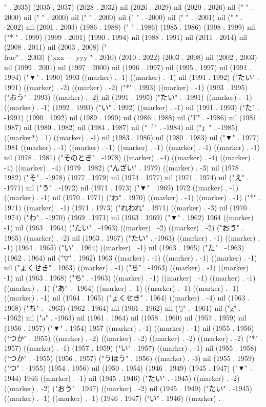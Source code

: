 {" . 2035) (2035 . 2037) (2028 . 2032) nil (2026 . 2029) nil (2020 . 2026) nil (" " . 2000) nil (" " . 2000) nil ("
" . 2000) nil ("
" . -2000) nil (" " . -2001) nil (" " . -2002) nil (2001 . 2003) (1986 . 1988) (" " . 1986) (1985 . 1986) (1998 . 1999) nil ("*
" . 1999) (1999 . 2001) (1990 . 1994) nil (1988 . 1991) nil (2011 . 2014) nil (2008 . 2011) nil (2003 . 2008) ("\\frac" . -2003) ("xxx
---
yyy
" . 2010) (2010 . 2022) (2003 . 2008) nil (2002 . 2003) nil (1999 . 2001) nil (1997 . 2000) nil (1996 . 1997) nil (1995 . 1997) nil (1991 . 1994) ("▼" . 1990) 1993 ((marker) . -1) ((marker) . -1) nil (1991 . 1992) ("たい" . 1991) ((marker) . -2) ((marker) . -2) ("*" . 1993) ((marker) . -1) (1993 . 1995) ("おう" . 1993) ((marker) . -2) nil (1991 . 1995) ("たい" . -1991) ((marker) . -1) ((marker) . -1) (1992 . 1993) ("い" . 1992) ((marker) . -1) nil (1991 . 1993) ("た" . -1991) (1990 . 1992) nil (1989 . 1990) nil (1986 . 1988) nil ("F" . -1986) nil (1981 . 1987) nil (1980 . 1982) nil (1984 . 1987) nil ("「" . -1984) nil ("」" . -1985) ((marker*) . 1) ((marker) . -1) nil (1983 . 1986) nil (1980 . 1983) nil ("▼" . 1977) 1981 ((marker) . -1) ((marker) . -1) ((marker) . -1) ((marker) . -1) ((marker) . -1) nil (1978 . 1981) ("そのとき" . -1978) ((marker) . -4) ((marker) . -4) ((marker) . -4) ((marker) . -4) (1979 . 1982) ("んざい" . 1979) ((marker) . -3) nil (1978 . 1982) ("そ" . -1978) (1977 . 1979) nil (1974 . 1977) nil (1971 . 1974) nil ("え" . -1971) nil ("う" . -1972) nil (1971 . 1973) ("▼" . 1969) 1972 ((marker) . -1) ((marker) . -1) nil (1970 . 1971) ("わ" . 1970) ((marker) . -1) ((marker) . -1) ("*" . 1971) ((marker) . -1) (1971 . 1973) ("れわれ" . 1971) ((marker) . -3) nil (1970 . 1974) ("わ" . -1970) (1969 . 1971) nil (1963 . 1969) ("▼" . 1962) 1964 ((marker) . -1) nil (1963 . 1964) ("たい" . -1963) ((marker) . -2) ((marker) . -2) ("おう" . 1965) ((marker) . -2) nil (1963 . 1967) ("たい" . -1963) ((marker) . -1) ((marker) . -1) (1964 . 1965) ("い" . 1964) ((marker) . -1) nil (1963 . 1965) ("た" . -1963) (1962 . 1964) nil ("▽" . 1962) 1963 ((marker) . -1) ((marker) . -1) ((marker) . -1) nil ("ょくせき" . 1963) ((marker) . -4) ("ち" . -1963) ((marker) . -1) ((marker) . -1) nil (1963 . 1968) ("ち" . -1963) ((marker) . -1) ((marker) . -1) ((marker) . -1) ((marker) . -1) ("あ" . -1964) ((marker) . -1) ((marker) . -1) ((marker) . -1) ((marker) . -1) nil (1964 . 1965) ("ょくせき" . 1964) ((marker) . -4) nil (1963 . 1968) ("ち" . -1963) (1962 . 1964) nil (1961 . 1962) nil ("j" . -1961) nil ("g" . -1962) nil ("a" . -1963) nil (1961 . 1964) nil (1958 . 1960) nil (1957 . 1959) nil (1956 . 1957) ("▼" . 1954) 1957 ((marker) . -1) ((marker) . -1) nil (1955 . 1956) ("つか" . 1955) ((marker) . -2) ((marker) . -2) ((marker) . -2) ((marker) . -2) ("*" . 1957) ((marker) . -1) (1957 . 1959) ("い" . 1957) ((marker) . -1) nil (1955 . 1958) ("つか" . -1955) (1956 . 1957) ("うほう" . 1956) ((marker) . -3) nil (1955 . 1959) ("つ" . -1955) (1954 . 1956) nil (1950 . 1954) (1946 . 1949) (1945 . 1947) ("▼" . 1944) 1946 ((marker) . -1) nil (1945 . 1946) ("たい" . -1945) ((marker) . -2) ((marker) . -2) ("おう" . 1947) ((marker) . -2) nil (1945 . 1949) ("たい" . -1945) ((marker) . -1) ((marker) . -1) (1946 . 1947) ("い" . 1946) ((marker) . }

